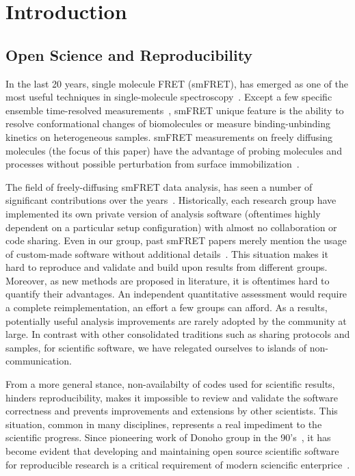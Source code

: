 \section{Introduction}

\subsection{Open Science and Reproducibility}

In the last 20 years, single molecule FRET (smFRET), has emerged as one of the most
useful techniques in single-molecule spectroscopy~\cite{Weiss_1999,Hohlbein_2014}. 
Except a few specific ensemble time-resolved measurements~\cite{Lerner_2014,Rahamim_2015}, 
smFRET unique feature is the ability to resolve conformational 
changes of biomolecules or measure binding-unbinding kinetics on heterogeneous samples. 
smFRET measurements on freely diffusing molecules (the focus of this paper) have the advantage 
of probing molecules and processes without possible perturbation from surface 
immobilization~\cite{Dahan_1999,Eggeling_1998}. 

The field of freely-diffusing smFRET data analysis, has seen a number of significant 
contributions over the 
years~\cite{Fries_1998,Eggeling_2001,Zhang_2005,Gopich_2005,Lee_2005,Nir_2006,Antonik2006,Gopich_2007,Gopich_2008,Camley_2009,Santoso_2010,Torella_2011,Tomov_2012}. 
Historically, each research group have implemented its own private version
of analysis software (oftentimes highly dependent on a particular setup
configuration) with almost no collaboration or code sharing.
Even in our group, past smFRET papers merely mention the usage of custom-made software without 
additional details~\cite{Lee_2005,Nir_2006}.
This situation makes it hard to reproduce and validate and build upon 
results from different groups.
Moreover, as new methods are proposed in literature, 
it is oftentimes hard to quantify their advantages.
An independent quantitative assessment
would require a complete reimplementation, an effort a few groups can afford.
As a results, potentially useful analysis improvements
are rarely adopted by the community at large.
In contrast with other consolidated traditions such as 
sharing protocols and samples, for scientific software,
we have relegated ourselves to islands of non-communication.

From a more general stance, non-availabilty of codes 
used for scientific results, hinders reproducibility, 
makes it impossible to review and validate the software correctness
and prevents improvements and extensions by other scientists.
This situation, common in many disciplines, 
represents a real impediment to the scientific progress.
Since pioneering work of Donoho group in the 90's~\cite{Buckheit_1995},
it has become evident that developing and maintaining open source scientific software
for reproducible research is a critical requirement of modern 
sciencific enterprice~\cite{Ince_2012,Vihinen_2015}. 

